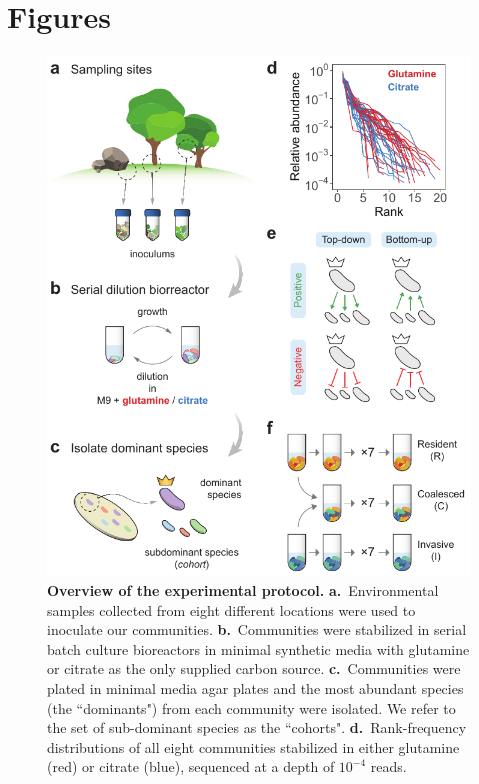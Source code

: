 \documentclass[a4paper,10pt]{article}
\begin{document}
\clearpage

\clearpage

%


\clearpage

\section*{Figures}\label{figs}

\begin{figure}[!h]
\centering
\includegraphics[width=12cm,keepaspectratio]{figs/fig1.pdf}
\caption{\textbf{Overview of the experimental protocol.}
\textbf{a.}~Environmental samples collected from eight different locations were used
to inoculate our communities.
\textbf{b.}~Communities were stabilized in serial batch culture bioreactors
\cite{Goldford2018} in minimal synthetic media with glutamine or citrate as the
only supplied carbon source.
\textbf{c.}~Communities were plated in minimal media agar plates and the most abundant
species (the ``dominants") from each community were isolated. We refer to the set of
sub-dominant species as the ``cohorts".
\textbf{d.}~Rank-frequency distributions of all eight communities stabilized in either
glutamine (red) or citrate (blue), sequenced at a depth of $10^{-4}$ reads.
}
\end{figure}
\end{document}

